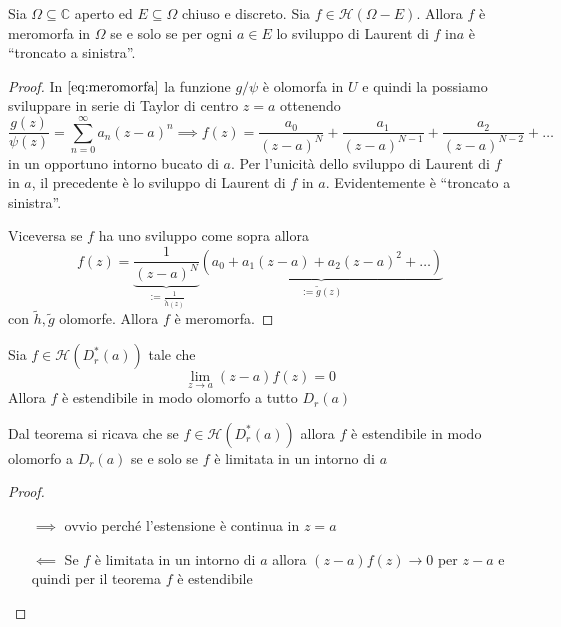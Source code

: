 \begin{proposition}\label{prp:meromorfa-troncato-sinistra}
    Sia \(\Omega \subseteq  \mathbb{C}\) aperto ed \(E \subseteq \Omega \)
    chiuso e discreto. Sia \(f \in \mathcal{H}{(\Omega - E)}\). Allora \(f\) è
    meromorfa in \(\Omega\) se e solo se per ogni \(a \in E\) lo sviluppo di
    Laurent di \(f\) in\(a\) è ``troncato a sinistra''.
\end{proposition}
\begin{proof}
In \(\eqref{eq:meromorfa}\) la funzione \(g / \psi\) è olomorfa in \(U\) e
quindi la possiamo sviluppare in serie di Taylor di centro \(z=a\) ottenendo
\[
    \frac{g{(z)}}{\psi {(z)}} = \sum_{n=0}^{\infty} a_{n} {(z-a)}^{n} \implies
    f{(z)} = \frac{a_{0}}{{(z-a)}^{N}} + \frac{a_{1}}{{(z-a)}^{N-1}} +
    \frac{a_{2}}{{(z-a)}^{N-2}} + \dots
\]
in un opportuno intorno bucato di \(a\). Per l'unicità dello sviluppo di Laurent
di \(f\) in \(a\), il precedente è lo sviluppo di Laurent di \(f\) in \(a\).
Evidentemente è ``troncato a sinistra''.

Viceversa se \(f\) ha uno sviluppo come sopra allora
\[
    f{(z)} = \underbrace{\frac{1}{{(z-a)}^{N}}}_{:= \frac{1}{\tilde{h}{(z)}}}
    \underbrace{\left( a_{0} + a_{1}{(z-a)} + a_{2}{(z-a)}^2 +
    \dots\right)}_{:=\tilde{g}{(z)}} 
\]
con \(\tilde{h}, \tilde{g}\) olomorfe. Allora \(f\) è meromorfa.
\end{proof}
\begin{theorem}\label{thm:estensione-riemann}
    Sia \(f \in \mathcal{H}{(D^{*}_r{(a)})}\) tale che 
\[
    \lim_{z \to a} {(z-a)}f{(z)} = 0
\]
    Allora \(f\) è estendibile in modo olomorfo a tutto \(D_r{(a)}\) 
\end{theorem}
\begin{corollary}
    Dal teorema si ricava che se \(f \in \mathcal{H}{(D^{*}_r{(a)})}\) allora
    \(f\) è estendibile in modo olomorfo a \(D_r{(a)}\) se e solo se \(f\)
    è limitata in un intorno di \(a\) 
\end{corollary}
\begin{proof}\( \)
\begin{itemize}
    \item[\(\implies \)] ovvio perché l'estensione è continua in \(z=a\) 
    \item[\(\impliedby \)] Se \(f\) è limitata in un intorno di \(a\) allora
        \({(z-a)}f{(z)} \to 0\) per \(z-a\) e quindi per il teorema \(f\) è
        estendibile
\end{itemize}
\end{proof}
